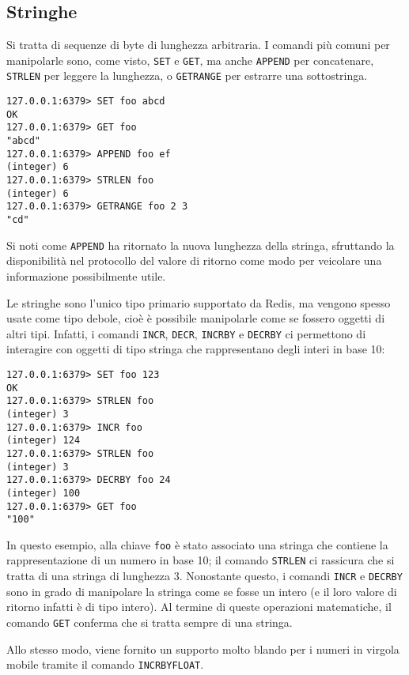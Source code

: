 \subsection{Stringhe}

Si tratta di sequenze di byte di lunghezza arbitraria. I comandi
più comuni per manipolarle sono, come visto, \verb|SET| e \verb|GET|, ma anche \verb|APPEND|
per concatenare, \verb|STRLEN| per leggere la lunghezza, o \verb|GETRANGE| per estrarre una
sottostringa.

\medskip
\begin{lstlisting}
127.0.0.1:6379> SET foo abcd
OK
127.0.0.1:6379> GET foo
"abcd"
127.0.0.1:6379> APPEND foo ef
(integer) 6
127.0.0.1:6379> STRLEN foo
(integer) 6
127.0.0.1:6379> GETRANGE foo 2 3
"cd"
\end{lstlisting}

Si noti come \verb|APPEND| ha ritornato la nuova lunghezza della stringa, sfruttando
la disponibilità nel protocollo del valore di ritorno come modo per veicolare una
informazione possibilmente utile.

Le stringhe sono l'unico tipo primario supportato da Redis, ma vengono spesso usate come tipo
debole, cioè è possibile manipolarle come se fossero oggetti di altri tipi. Infatti,
i comandi \verb|INCR|, \verb|DECR|,  \verb|INCRBY| e \verb|DECRBY| ci permettono
di interagire con oggetti di tipo stringa che rappresentano degli interi in base 10:

\medskip
\begin{lstlisting}
127.0.0.1:6379> SET foo 123
OK
127.0.0.1:6379> STRLEN foo
(integer) 3
127.0.0.1:6379> INCR foo
(integer) 124
127.0.0.1:6379> STRLEN foo
(integer) 3
127.0.0.1:6379> DECRBY foo 24
(integer) 100
127.0.0.1:6379> GET foo
"100"
\end{lstlisting}

In questo esempio, alla chiave \verb|foo| è stato associato una stringa che contiene
la rappresentazione di un numero in base 10; il comando \verb|STRLEN| ci rassicura
che si tratta di una stringa di lunghezza 3. Nonostante questo, i comandi \verb|INCR|
e \verb|DECRBY| sono in grado di manipolare la stringa come se fosse un intero (e il
loro valore di ritorno infatti è di tipo intero). Al termine di queste operazioni
matematiche, il comando \verb|GET| conferma che si tratta sempre di una stringa.

Allo stesso modo, viene fornito un supporto molto blando per i numeri in virgola
mobile tramite il comando \verb|INCRBYFLOAT|.


